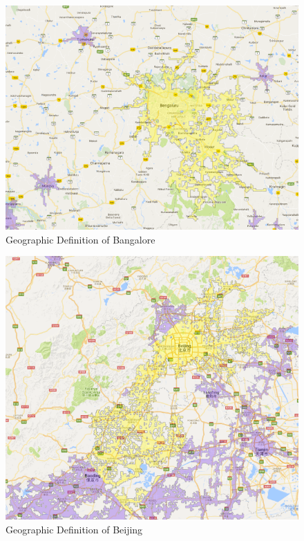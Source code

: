 \documentclass[12pt]{article}
\begin{document}
\begin{figure}[h]
\begin{centering}
  \includegraphics[width=\textwidth]{Bangalore}
  \caption{Geographic Definition of Bangalore}
   \label{fig:Bangalore}
\end{centering}
\end{figure}

\begin{figure}[h]
\begin{centering}
  \includegraphics[width=\textwidth]{Beijing}
  \caption{Geographic Definition of Beijing}
   \label{fig:Beijing}
\end{centering}
\end{figure}
\end{document}
